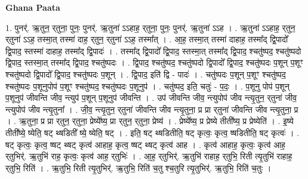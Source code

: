 \documentclass[17pt]{extarticle}
\begin{document}
\textbf{Ghana Paata } \newline

1. पुनर्॑. ऋ॒तुन॒ र्‌तुना॒ पुनः॒ पुनर्॑. ऋ॒तुना॑ ऽऽहाह॒ र्‌तुना॒ पुनः॒ पुनर्॑. ऋ॒तुना॑ ऽऽह । . ऋ॒तुना॑ ऽऽहाह॒ र्‌तुन॒ र्‌तुना॑ ऽऽह॒ तस्मा॒त् तस्मा॑ दाह॒ र्‌तुन॒ र्‌तुना॑ ऽऽह॒ तस्मा᳚त् । . आ॒ह॒ तस्मा॒त् तस्मा॑ दाहाह॒ तस्मा᳚द् द्वि॒पादो᳚ द्वि॒पाद॒ स्तस्मा॑ दाहाह॒ तस्मा᳚द् द्वि॒पादः॑ । . तस्मा᳚द् द्वि॒पादो᳚ द्वि॒पाद॒ स्तस्मा॒त् तस्मा᳚द् द्वि॒पाद॒ श्चतु॑ष्पद॒ श्चतु॑ष्पदो द्वि॒पाद॒ स्तस्मा॒त् तस्मा᳚द् द्वि॒पाद॒ श्चतु॑ष्पदः । . द्वि॒पाद॒ श्चतु॑ष्पद॒ श्चतु॑ष्पदो द्वि॒पादो᳚ द्वि॒पाद॒ श्चतु॑ष्पदः प॒शून् प॒शूꣳ 
श्चतु॑ष्पदो द्वि॒पादो᳚ द्वि॒पाद॒ श्चतु॑ष्पदः प॒शून् । . द्वि॒पाद॒ इति॑ द्वि - पादः॑ । . चतु॑ष्पदः प॒शून् प॒शूꣳ श्चतु॑ष्पद॒ श्चतु॑ष्पदः प॒शूनुपोप॑ प॒शूꣳ
श्चतु॑ष्पद॒ श्चतु॑ष्पदः प॒शूनुप॑ । . चतु॑ष्पद॒ इति॒ चतुः॑ - प॒दः॒ । . प॒शूनु पोप॑ प॒शून् प॒शूनुप॑ जीवन्ति जीव॒ न्त्युप॑ प॒शून् प॒शूनुप॑ जीवन्ति । . उप॑ जीवन्ति जीव॒ न्त्युपोप॑ जीव न्त्यृ॒तुन॒ र्‌तुना॑ जीव॒ न्त्युपोप॑ जीव न्त्यृ॒तुना᳚ । . जी॒व॒ न्त्यृ॒तुन॒ र्‌तुना॑ जीवन्ति जीव न्त्यृ॒तुना॒ प्र प्रा र्‌तुना॑ जीवन्ति जीव न्त्यृ॒तुना॒ प्र । . ऋ॒तुना॒ प्र प्रा र्‌तुन॒ र्‌तुना॒ प्रेष्ये᳚ष्य॒ प्रा र्‌तुन॒ र्‌तुना॒ प्रेष्य॑ । . प्रेष्ये᳚ष्य॒ प्र प्रेष्ये तीती᳚ष्य॒ प्र प्रेष्येति॑ । . इ॒ष्ये तीती᳚ष्ये॒ ष्येति॒ षट् थ्षडिती᳚ ष्ये॒ ष्येति॒ षट् । . इति॒ षट् थ्षडितीति॒ षट् कृत्वः॒ कृत्व॒ ष्षडितीति॒ षट् कृत्वः॑ । . षट् कृत्वः॒ कृत्व॒ ष्षट् थ्षट् कृत्व॑ आहाह॒ कृत्व॒ ष्षट् थ्षट् कृत्व॑ आह । . कृत्व॑ आहाह॒ कृत्वः॒ कृत्व॑ आह॒ र्‌तुभिर्॑. ऋ॒तुभि॑ राह॒ कृत्वः॒ कृत्व॑ आह॒ र्‌तुभिः॑ । . आ॒ह॒ र्‌तुभिर्॑. ऋ॒तुभि॑ राहाह॒ र्‌तुभि॒ रिती त्यृ॒तुभि॑ राहाह॒ र्‌तुभि॒ रिति॑ । . ऋ॒तुभि॒ रिती त्यृ॒तुभिर्॑. ऋ॒तुभि॒ रिति॑ च॒तु श्च॒तुरि त्यृ॒तुभिर्॑. ऋ॒तुभि॒ रिति॑ च॒तुः । \newline
\end{document}
